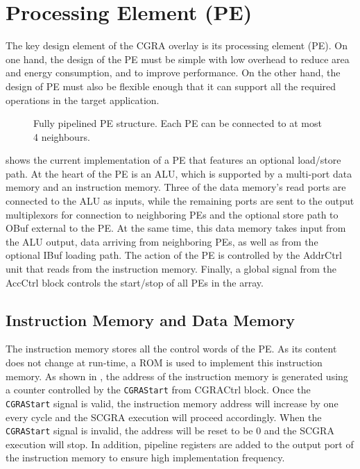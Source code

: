 \section{Processing Element (PE)}
The key design element of the CGRA overlay is its processing element (PE). On one hand, the design of the PE must be simple with low overhead to reduce area and energy consumption, and to improve performance. On the other hand, the design of PE must also be flexible enough that it can support all the required operations in the target application.

\begin{figure}
\center{\texttt{[image: pe]}}
\caption{Fully pipelined PE structure. Each PE can be connected to at most 4 neighbours.}
\label{fig:pe}
\end{figure}

 shows the current implementation of a PE that features an optional load/store path. At the heart of the PE is an ALU, which is supported by a multi-port data memory and an instruction memory. Three of the data memory's read ports are connected to the ALU as inputs, while the remaining ports are sent to the output multiplexors for connection to neighboring PEs and the optional store path to OBuf external to the PE. At the same time, this data memory takes input from the ALU output, data arriving from neighboring PEs, as well as from the optional IBuf loading path. The action of the PE is controlled by the AddrCtrl unit that reads from the instruction memory. Finally, a global signal from the AccCtrl block controls the start/stop of all PEs in the array.

\subsection{Instruction Memory and Data Memory}
The instruction memory stores all the control words of the PE. As its content does not change at run-time, a ROM is used to implement this instruction memory. As shown in , the address of the instruction memory is generated using a counter controlled by the \texttt{CGRAStart} from CGRACtrl block. Once the \texttt{CGRAStart} signal is valid, the instruction memory address will increase by one every cycle and the SCGRA execution will proceed accordingly. When the \texttt{CGRAStart} signal is invalid, the address will be reset to be 0 and the SCGRA execution will stop. In addition, pipeline registers are added to the output port of the instruction memory to ensure high implementation frequency.

